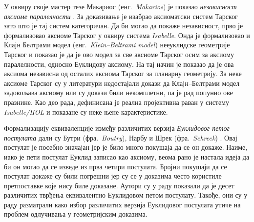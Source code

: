 У оквиру своје мастер тезе Макариос (енг.~\emph{Makarios}) је показао
\emph{независност аксиоме паралелности} \cite{makarios2012}. За
доказивање је изабрао аксиоматски систем Тарског зато што је тај
систем категоричан. Да би могао да покаже независност, прво је
формализовао аксиоме Тарског у оквиру система \emph{Isabelle}.  Онда
је формализовао и Клајн Белтрами модел (енг.~\emph{Klein--Beltrami
  model}) нееуклидске геометрије Тарског и показао је да је ово модел
за све аксиоме Тарског осим за аксиому паралелности, односно Еуклидову
аксиому. На тај начин је показао да је ова аксиома независна од
осталих аксиома Тарског за планарну геометрију. За неке аксиоме
Тарског су у литератури недостајали докази да Клајн--Белтрами модел
задовољава аксиому или су докази били некомплетни, па је рад попунио
ове празнине. Као део рада, дефинисана је реална пројективна раван у
систему \emph{Isabelle/HOL} и показане су неке њене карактеристике.

Формализацију еквиваленције између различитих верзија \emph{Еуклидовог
  петог постулата} дали су Бутри (фра.~\emph{Boutry}), Нарбу и Шрек
(фра.~\emph{Schreck}) \cite{boutry2015parallel}. Овај постулат је
посебно значајан јер је било много покушаја да се он докаже. Наиме,
иако је пети постулат Еуклид записао као аксиому, веома рано је
настала идеја да би он могао да се изведе из прва четири
постулата. Бројни покушаји да се постулат докаже су били погрешни јер
су се у доказима често користиле претпоставке које нису биле
доказане. Аутори су у раду показали да је десет различитих тврђења
еквивалентно Еуклидовом петом постулату. Такође, они су у раду
разматрали како избор различитих верзија Еуклидовог постулата утиче на
проблем одлучивања у геометријским доказима.

